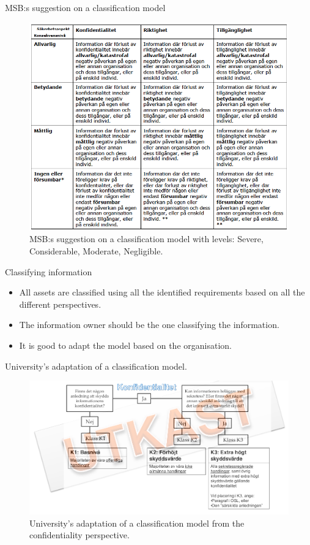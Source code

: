 \documentclass{beamer}
\begin{document}
\begin{frame}{MSB:s suggestion on a classification model}
  \begin{figure}
    \includegraphics[height=0.7\textheight]{Figures/msb-klassificering.png}
    \caption{MSB:s suggestion on a classification model with levels: Severe, Considerable,
      Moderate, Negligible.}
  \end{figure}
\end{frame}

\begin{frame}{Classifying information}
  \begin{itemize}
    \item All assets are classified using all the identified requirements based
      on all the different perspectives.
    \item The information owner should be the one classifying the information.
    \item It is good to adapt the model based on the organisation.
  \end{itemize}
\end{frame}

\begin{frame}{University's adaptation of a classification model.}
  \begin{figure}
    \includegraphics[width=\textwidth]{Figures/miun-klassificering.png}
    \caption{University's adaptation of a classification model from the
      confidentiality perspective.}
  \end{figure}
\end{frame}
\end{document}
